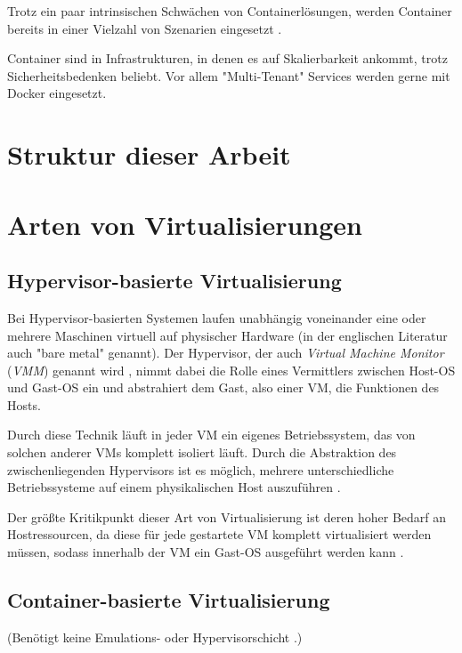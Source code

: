\documentclass[11pt,a4paper,oneside]{report}
\begin{document}
  Trotz ein paar intrinsischen Schwächen von Containerlösungen, werden Container bereits in einer Vielzahl von Szenarien eingesetzt \cite[S.6]{dockerBook}.

  Container sind in Infrastrukturen, in denen es auf Skalierbarkeit ankommt, trotz Sicherheitsbedenken beliebt. Vor allem "Multi-Tenant" Services werden gerne mit Docker eingesetzt.

  \section{Struktur dieser Arbeit}

	\section{Arten von Virtualisierungen}
    \subsection{Hypervisor-basierte Virtualisierung}
      Bei Hypervisor-basierten Systemen laufen unabhängig voneinander eine oder mehrere Maschinen virtuell auf physischer Hardware (in der englischen Literatur auch "bare metal" genannt). Der Hypervisor, der auch \emph{Virtual Machine Monitor} (\emph{VMM}) genannt wird \cite[S.2]{containerVirtPerformance}, nimmt dabei die Rolle eines Vermittlers zwischen Host-OS und Gast-OS ein \cite[S.6]{dockerBook} und abstrahiert dem Gast, also einer VM, die Funktionen des Hosts.

      Durch diese Technik läuft in jeder VM ein eigenes Betriebssystem, das von solchen anderer VMs komplett isoliert läuft. Durch die Abstraktion des zwischenliegenden Hypervisors ist es möglich, mehrere unterschiedliche Betriebssysteme auf einem physikalischen Host auszuführen \cite[S.2]{containerVirtPerformance}.

      Der größte Kritikpunkt dieser Art von Virtualisierung ist deren hoher Bedarf an Hostressourcen, da diese für jede gestartete VM komplett virtualisiert werden müssen, sodass innerhalb der VM ein Gast-OS ausgeführt werden kann \cite[S.1]{dockerIntroIEEE}.

    \subsection{Container-basierte Virtualisierung}
      (Benötigt keine Emulations- oder Hypervisorschicht \cite[S.7]{dockerBook}.)
\end{document}

